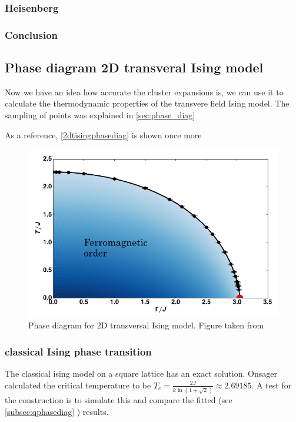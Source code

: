 \subsubsection{Heisenberg}

\subsubsection{Conclusion}

\subsection{Phase diagram 2D transveral Ising model}

Now we have an idea how accurate the cluster expansions is, we can use it to calculate the thermodynamic properties of the transvere field Ising model. The sampling of points was explained in \cref{sec:phase_diag}

As a reference, \cref{2dtisingphasediag} is shown once more

\begin{figure}
    \center
    \includegraphics[width=\textwidth]{Figuren/phsyics/2disingphase.png}
    \caption{Phase diagram for 2D transversal Ising model. Figure taken from \cite{Hesselmann2016}}
    \label{2dtisingphasediag2}
\end{figure}

\subsubsection{classical Ising phase transition}
The classical ising model on a square lattice has an exact solution. Onsager calculated the critical temperature to be $T_c = \frac{2 J}{k \ln(1+\sqrt{2}) } \approx 2.69185$. A test for the construction is to simulate this and compare the fitted (see \cref{subsec:qphasediag} ) results.

